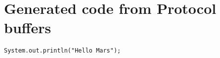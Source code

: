 \chapter{Generated code from Protocol buffers}

\begin{lstlisting}[caption={Source code of something},label=Listing]
System.out.println("Hello Mars");
\end{lstlisting}
